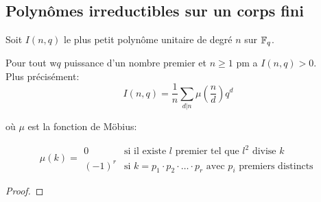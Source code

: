 \subsection{Polynômes irreductibles sur un corps fini}


Soit $I(n,q)$ le plus petit polynôme unitaire de degré $n$ sur $\mathbb{F}_q$.

\begin{theorem}
	Pour tout w$q$ puissance d'un nombre premier et $n \geq 1$ pm a $I(n,q) > 0$.\\

	Plus précisément:
	$$ I(n,q) = \frac{1}{n} \sum_{d|n} \mu(\frac{n}{d}) q^d$$

	où $\mu$ est la fonction de Möbius:

	\[ \mu(k) = \begin{array}{ll}
			0      & \text{si il existe } l \text{ premier tel que } l^2 \text{ divise } k                            \\
			(-1)^r & \text{si } k = p_1 \cdot p_2 \cdot \ldots \cdot p_r \text{ avec } p_i \text{ premiers distincts}
		\end{array} \]

\end{theorem}

\begin{proof}
\end{proof}

